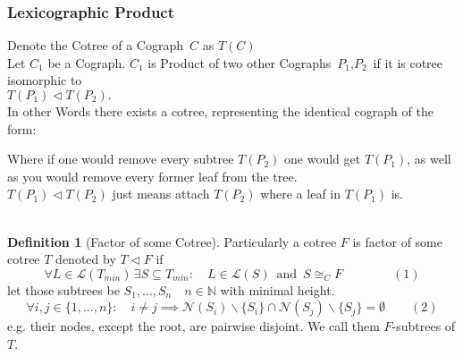 \documentclass[a4paper,12pt]{article}
\theoremstyle{definition}
\newtheorem{definition}{Definition}[section]
\begin{document}
	\subsubsection{Lexicographic Product}
	Denote the Cotree of a Cograph $\,C$ as $T(C)$\\
	Let $C_1$ be a Cograph. $C_1$ is Product of two other Cographs $\,P_1$,$P_2\,$ if  it is cotree isomorphic to \\$T(P_1)\vartriangleleft T(P_2).$\\
	In other Words there exists a cotree, representing the identical cograph of the form:
		\begin{center}
	\end{center}
	Where if one would remove every subtree $T(P_2)$ one would get $T(P_1)$, as well as you would remove every former leaf from the tree.\\
	$T(P_1)\vartriangleleft T(P_2)$ just means attach $T(P_2)$ where a leaf in $T(P_1)$ is.\\\\
	\begin{definition}[Factor of some Cotree]
		Particularly a cotree $F$ is factor of some cotree $T$ denoted by $T\vartriangleleft F$ if
		\[\forall L\in \mathcal{L}(T_{min})\,\exists S \subseteq T_{min}:\quad L\in\mathcal{L}(S)\,\text{ and }\, S\cong_C F\qquad\qquad (1)\] 
		let those subtrees be $S_1,...,S_n\quad n\in\mathds{N}$ with minimal height.
		\[\forall i,j\in\{1,...,n\}:\quad i\not = j \implies \mathcal{N}(S_i)\backslash \{S_i\}\cap \mathcal{N}(S_j)\backslash \{S_j\}=\emptyset\qquad (2)\]
		e.g. their nodes, except the root, are pairwise disjoint. We call them $F$-subtrees of $T$.\\
	\end{definition}
\end{document}
